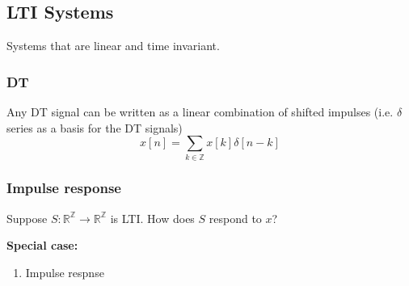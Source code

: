 \subsection{LTI Systems}
\begin{definition}
    Systems that are linear and time invariant.
\end{definition}

\subsubsection{DT}
\begin{definition}
    Any DT signal can be written as a linear combination of shifted impulses (i.e. $\delta$ series as a basis for the DT signals)
    \begin{equation}
        x[n] = \sum_{k \in \mathbb{Z}} x[k] \delta[n - k]
    \end{equation}
\end{definition}

\subsubsection{Impulse response}
\begin{definition}
    Suppose \( S: \mathbb{R}^\mathbb{Z} \to \mathbb{R}^\mathbb{Z} \) is LTI. How does \( S \) respond to \( x \)?
    
    \textbf{Special case:}
    \begin{enumerate}
        \item Impulse respnse
    \end{enumerate}
    
\end{definition}

